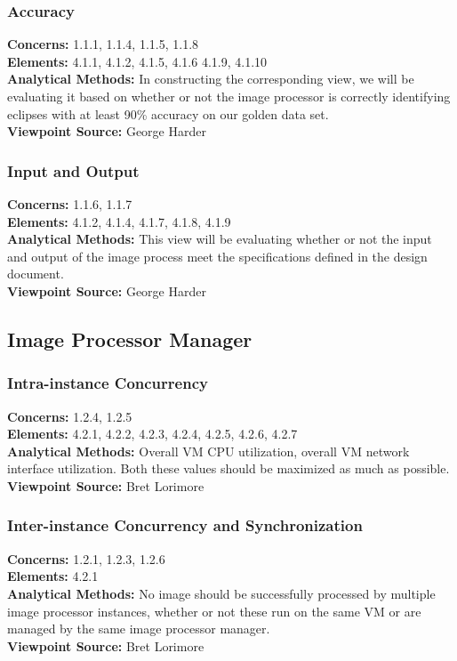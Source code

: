 \documentclass[10pt, onecolumn, draftclsnofoot, letterpaper, compsoc]{IEEEtran}
\begin{document}
\subsubsection{Accuracy}

\textbf{Concerns:} 1.1.1, 1.1.4, 1.1.5, 1.1.8 \\
\textbf{Elements:} 4.1.1, 4.1.2, 4.1.5, 4.1.6 4.1.9, 4.1.10\\
\textbf{Analytical Methods:}  In constructing the corresponding view, we will be
evaluating it based on whether or not the image processor is correctly
identifying eclipses with at least 90\% accuracy on our golden data set.\\
\textbf{Viewpoint Source:} George Harder \\

\subsubsection{Input and Output}

\textbf{Concerns:} 1.1.6, 1.1.7 \\
\textbf{Elements:} 4.1.2, 4.1.4, 4.1.7, 4.1.8, 4.1.9\\
\textbf{Analytical Methods:} This view will be evaluating whether or not the
input and output of the image process meet the specifications defined in the
design document. \\
\textbf{Viewpoint Source:} George Harder\\

\subsection{Image Processor Manager}

    \subsubsection{Intra-instance Concurrency}
    \textbf{Concerns:} 1.2.4, 1.2.5 \\
    \textbf{Elements:} 4.2.1, 4.2.2, 4.2.3, 4.2.4, 4.2.5, 4.2.6, 4.2.7 \\
    \textbf{Analytical Methods:} Overall VM CPU utilization, overall VM network interface utilization. 
    Both these values should be maximized as much as possible. \\
    \textbf{Viewpoint Source:} Bret Lorimore \\

    \subsubsection{Inter-instance Concurrency and Synchronization}
    \textbf{Concerns:} 1.2.1, 1.2.3, 1.2.6 \\
    \textbf{Elements:} 4.2.1 \\
    \textbf{Analytical Methods:} No image should be successfully processed by multiple image processor
    instances, whether or not these run on the same VM or are managed by the same image processor manager. \\
    \textbf{Viewpoint Source:} Bret Lorimore \\
\end{document}

